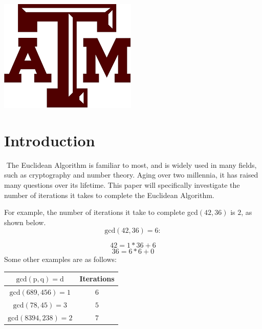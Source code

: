 \documentclass[11pt]{article}
\begin{document}
\begin{titlepage}

\includegraphics[scale=.3]{tamulogo.png}\\[1cm] 
 

\vfill 

\end{titlepage}

\tableofcontents
\newpage
\newpage

\section{Introduction}
$ $ \indent The Euclidean Algorithm is familiar to most, and is widely used in many fields, such as cryptography and number theory. Aging over two millennia, it has raised many questions over its lifetime. This paper will specifically investigate the number of iterations it takes to complete the Euclidean Algorithm. 

For example, the number of iterations it take to complete gcd$(42,36)$ is $2$, as shown below.
		$$\mathrm{gcd}(42,36) = 6:$$

	\begin{equation}
		42 = 1 * 36 + 6
	\end{equation}
	\begin{equation}
		36 = 6 * 6 + 0
	\end{equation}
Some other examples are as follows:

\begin{center}
\begin{tabular}{c|c}

$\mathrm{gcd}(\mathrm{p},\mathrm{q}) = \mathrm{d}$ & Iterations
\\
\hline
$\mathrm{gcd}(689,456) = 1$ & $6$\\

$\mathrm{gcd}(78,45) = 3$ & $5$\\

$\mathrm{gcd}(8394,238) = 2$ & $7$\\


\end{tabular}
\end{center}
\end{document}

